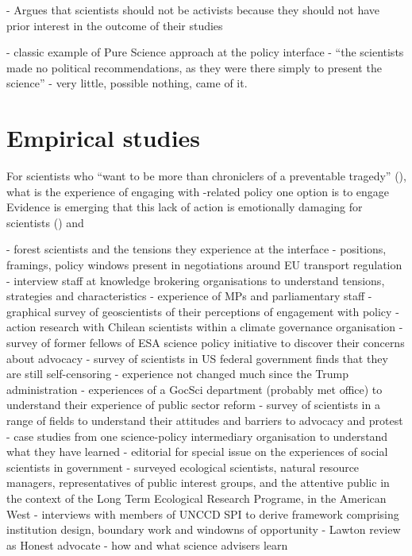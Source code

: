 \cite{Buntgen2024} - Argues that scientists should not be activists because they should not have prior interest in the outcome of their studies

\cite{Horton2022} - classic example of Pure Science approach at the policy interface - ``the scientists made no political recommendations, as they were there simply to present the science'' - very little, possible nothing, came of it.




\section{Empirical studies}
For scientists who ``want to be more than chroniclers of a preventable tragedy'' (\cite{WyattGT2024}), what is the experience of engaging with \CAN-related policy one option is to engage 
Evidence is emerging that this lack of action is emotionally damaging for \CAN{} scientists (\cite{Carrington2024}) and 

\cite{OjanenBKP2021} - forest scientists and the tensions they experience at the interface
\cite{vonMalmborg2024transport} - positions, framings, policy windows present in negotiations around EU transport regulation
\cite{MacKillopCDD2023} - interview staff at knowledge brokering organisations to understand tensions, strategies and characteristics
\cite{KennyRHTB2017} - experience of MPs and parliamentary staff
\cite{KalafatisL2019} - graphical survey of geoscientists of their perceptions of engagement with policy
\cite{IbarraJOBCIMRS2022} - action research with Chilean scientists within a climate governance organisation
\cite{ElsensohnACDGGKPRS2019} - survey of former fellows of ESA science policy initiative to discover their concerns about advocacy
\cite{DesikanC2023} - survey of scientists in US federal government finds that they are still self-censoring - experience not changed much since the Trump administration
\cite{DanfordDR2009} - experiences of a GocSci department (probably met office) to understand their experience of public sector reform
\cite{DablanderSCSBGGBAH2024} - survey of scientists in a range of fields to understand their attitudes and barriers to advocacy and protest
\cite{BednarekSHG2015} - case studies from one science-policy intermediary organisation to understand what they have learned
\cite{SaxonbergSL2023} - editorial for special issue on the experiences of social scientists in government
\cite{SteelLLS2004} - surveyed ecological scientists, natural resource managers, representatives of public interest groups, and the attentive public in the context of the Long Term Ecological Research Programe, in the American West
\cite{VelanderD2024} - interviews with members of UNCCD SPI to derive framework comprising institution design, boundary work and windowns of opportunity
\cite{RoseBOP2018} - Lawton review as Honest advocate
\cite{Obermeister2020} - how and what science advisers learn

